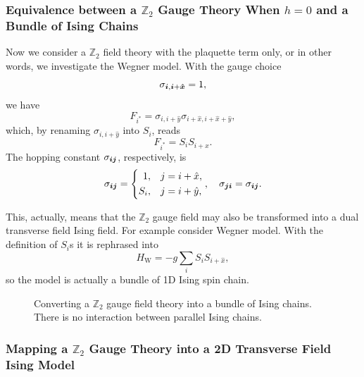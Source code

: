 \documentclass[hyperref, a4paper]{article}
\newcommand*{\Ztwo}{$\mathbb{Z}_2$ }
\newcommand*{\TFIM}{Transverse Field Ising Model }
\begin{document}
\subsubsection{Equivalence between a \Ztwo Gauge Theory When $h = 0$ and a Bundle of Ising Chains}

Now we consider a \Ztwo field theory with the plaquette term only, or in other words, we investigate the Wegner model.
With the gauge choice
\begin{equation}
    \sigma_{\vb*{i}, \vb*{i}+\vu*{x}} = 1,
    \label{eq:gauge-choice-x}
\end{equation}
we have
\begin{equation}
    F_{i^*} = \sigma_{i, i+\hat{y}} \sigma_{i+\hat{x}, i + \hat{x} + \hat{y}},
\end{equation}
which, by renaming $\sigma_{i, i+\hat{y}}$ into $S_i$, reads 
\begin{equation}
    F_{i^*} = S_i S_{i+\hat{x}}.
\end{equation}
The hopping constant $\sigma_{\vb*{i} \vb*{j}}$, respectively, is
\begin{equation}
    \sigma_{\vb*{i} \vb*{j}} = \left\{
    \begin{aligned}
        1, &\quad j = i + \hat{x}, \\
        S_i, &\quad j = i + \hat{y},
    \end{aligned}
\right., \quad \sigma_{\vb*{j} \vb*{i}} = \sigma_{\vb*{i} \vb*{j}}.
\end{equation}

This, actually, means that the \Ztwo gauge field may also be transformed into a dual transverse field Ising field.
For example consider Wegner model.
With the definition of $S_i$s it is rephrased into
\begin{equation}
    H_\text{W} = -g \sum_i S_i S_{i+\hat{x}},
\end{equation}
so the model is actually a bundle of 1D Ising spin chain.

\begin{figure}
    \centering
    
    \caption{Converting a \Ztwo gauge field theory into a bundle of Ising chains. There is no interaction between parallel Ising chains.}
\end{figure}

\subsubsection{Mapping a \Ztwo Gauge Theory into a 2D \TFIM}
\end{document}
